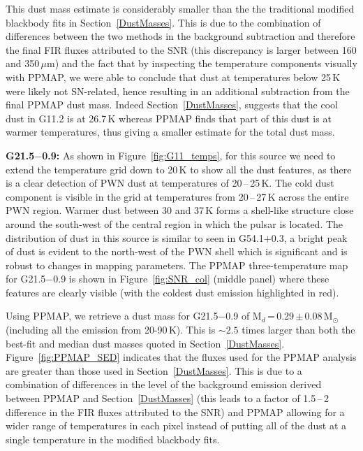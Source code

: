 \documentclass[fleqn,usenatbib]{mnras}
\newcommand\PPMAPMassb{0.29}
\newcommand\PPMAPMassErrb{0.08}
\begin{document}
{{%

{This dust mass estimate is considerably smaller than the the traditional modified blackbody fits in Section~\ref{DustMasses}. This is due to the combination of differences between the two methods in the background subtraction and therefore the final FIR fluxes attributed to the SNR (this discrepancy is larger between 160 and 350\,$\mu$m) and the fact that by inspecting the temperature components visually with PPMAP, we were able to conclude that dust at temperatures below 25\,K were likely not SN-related, hence resulting in an additional subtraction from the final PPMAP dust mass.  Indeed Section~\ref{DustMasses}, suggests that the cool dust in G11.2 is at 26.7\,K whereas PPMAP finds that part of this dust is at warmer temperatures, thus giving a smaller estimate for the total dust mass.
}

\bigskip

\textbf{G21.5$-$0.9:}
As shown in Figure~\ref{fig:G11_temps}, for this source we need to extend the temperature grid down to 20\,K to show all the dust features, as there is a clear detection of PWN dust at temperatures of 20\,--\,25\,K.  The cold dust component is visible in the grid at temperatures from 20\,--\,27\,K across the entire PWN region.  Warmer dust between 30 and 37\,K forms a shell-like structure close around the south-west of the central region in which the pulsar is located. The distribution of dust in this source is similar to seen in G54.1$+$0.3, a bright peak of dust is evident to the north-west of the PWN shell which is significant and is robust to changes in mapping parameters. The PPMAP three-temperature map for G21.5$-$0.9 is shown in Figure~\ref{fig:SNR_col} (middle panel) where these features are clearly visible (with the coldest dust emission highlighted in red).

Using PPMAP, we retrieve a dust mass for G21.5$-$0.9 of M$_d$\,=\,\PPMAPMassb\,$\pm$\,\PPMAPMassErrb\,M$_\odot$ (including all the emission from 20-90\,K). This is $\sim 2.5$ times larger than both the best-fit and median dust masses quoted in Section~\ref{DustMasses}.
{Figure~\ref{fig:PPMAP_SED} indicates that the fluxes used for the PPMAP analysis are greater than those used in Section~\ref{DustMasses}. This is due to a combination of differences in the level of the background emission derived between PPMAP and Section~\ref{DustMasses} (this leads to a factor of 1.5\,--\,2 difference in the FIR fluxes attributed to the SNR) and PPMAP allowing for a wider range of temperatures in each pixel instead of putting all of the dust at a single temperature in the modified blackbody fits. }

}}
\end{document}
